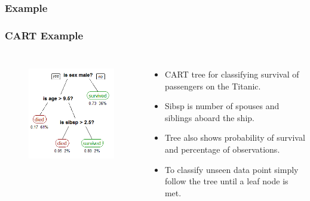 \documentclass[mathserif]{beamer}
\begin{document}
	\subsubsection{Example}
	\begin{frame}
		\frametitle{CART Example}
		\begin{columns}[t]
			\begin{figure}
				\centering
				\includegraphics[keepaspectratio,scale=0.5]{CART.png} \\ \vspace{5px}
			\end{figure}
			
			\begin{itemize}
				\item CART tree for classifying survival of passengers on the Titanic.
				\item Sibsp is number of spouses and siblings aboard the ship.
				\item Tree also shows probability of survival and percentage of observations.
				\item To classify unseen data point simply follow the tree until a leaf node is met.
			\end{itemize}
		\end{columns}
	\end{frame}
	
	
	
\end{document}
